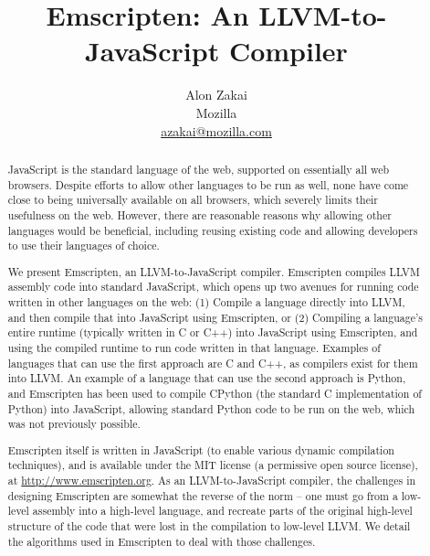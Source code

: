 \documentclass[11pt]{proc}
\begin{document}


\title{Emscripten: An LLVM-to-JavaScript Compiler}


\author{Alon Zakai \\ Mozilla \\ \url{azakai@mozilla.com}}

\maketitle

\begin{abstract}
JavaScript is the standard language of the web, supported on essentially
all web browsers. Despite efforts to allow other languages to be run as well,
none have come close to being universally available on all
browsers, which severely limits their usefulness on the web. However, there are reasonable reasons why
allowing other languages would be beneficial, including reusing existing code and allowing
developers to use their languages of choice.

We present Emscripten, an LLVM-to-JavaScript compiler. Emscripten compiles
LLVM assembly code into standard JavaScript, which opens up two avenues for running code written
in other languages on the web: (1) Compile a language directly into LLVM, and
then compile that into JavaScript using Emscripten, or (2) Compiling
a language's entire runtime (typically written in C or C++) into JavaScript using Emscripten, and
using the compiled runtime to run code written in that language. Examples of languages
that can use the first approach are C and C++, as compilers exist for them into LLVM. An example
of a language that can use the second approach is Python, and Emscripten has
been used to compile CPython (the standard C implementation of Python) into JavaScript,
allowing standard Python code to be run on the web, which was not previously
possible.

Emscripten itself is written in JavaScript (to enable various
dynamic compilation techniques), and is available under the MIT
license (a permissive open source license), at \url{http://www.emscripten.org}.
As an LLVM-to-JavaScript compiler, the challenges in designing
Emscripten are somewhat the reverse of the norm -- one must go from a low-level
assembly into a high-level language, and recreate parts of the original
high-level structure of the code that were lost in the compilation to
low-level LLVM. We detail the algorithms used in
Emscripten to deal with those challenges.

\end{abstract}
\end{document}
